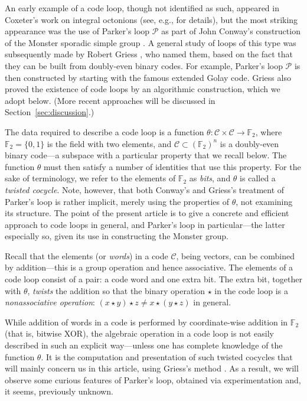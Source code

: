 \documentclass{article}
\theoremstyle{plain}
\theoremstyle{definition}
\def \cC {\mathcal{C}}
\def \cP {\mathcal{P}}
\def \FF {\mathbb{F}}
\begin{document}
An early example of a code loop, though not identified as such, appeared in Coxeter's work on integral octonions \cite{Coxeter} (see, e.g., \cite[\S 2]{Griess87} for details), but the most striking appearance was the use of Parker's loop $\cP$ as part of John Conway's construction of the Monster sporadic simple group \cite{Conway}. 
A general study of loops of this type was subsequently made by Robert Griess \cite{Griess}, who named them, based on the fact that they can be built from doubly-even binary codes. 
For example, Parker's loop $\cP$ is then constructed by starting with the famous extended Golay code.
Griess also proved the existence of code loops by an algorithmic construction, which we adopt below.
(More recent approaches will be discussed in Section~\ref{sec:discussion}.)

The data required to describe a code loop is a function $\theta\colon \cC\times \cC \to \FF_2$, where $\FF_2 = \{0,1\}$ is the field with two elements, and $\cC\subset (\FF_2)^n$ is a doubly-even binary code---a subspace with a particular property that we recall below. 
The function $\theta$ must then satisfy a number of identities that use this property.
For the sake of terminology, we refer to the elements of $\FF_2$ as \emph{bits}, and $\theta$ is called a \emph{twisted cocycle}.
Note, however, that both Conway's and Griess's treatment of Parker's loop is rather implicit, merely using the properties of $\theta$, not examining its structure. 
The point of the present article is to give a concrete and efficient approach to code loops in general, and Parker's loop in particular---the latter especially so, given its use in constructing the Monster group.

Recall that the elements (or \emph{words}) in a code $\cC$, being vectors, can be combined by addition---this is a group operation and hence associative. 
The elements of a code loop consist of a pair: a code word and one extra bit.
The extra bit, together with $\theta$, \emph{twists} the addition so that the binary operation $\star$ in the code loop is a \emph{nonassociative operation}: $(x\star y)\star z\not=x\star (y\star z)$ in general.

While addition of words in a code is performed by coordinate-wise addition in $\FF_2$ (that is, bitwise XOR), the algebraic operation in a code loop is not easily described in such an explicit way---unless one has complete knowledge of the function $\theta$.
It is the computation and presentation of such twisted cocycles that will mainly concern us in this article, using Griess's method \cite[proof of Theorem 10]{Griess}.
As a result, we will observe some curious features of Parker's loop, obtained via experimentation and, it seems, previously unknown.
\end{document}
